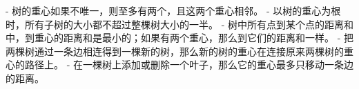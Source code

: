 - 树的重心如果不唯一，则至多有两个，且这两个重心相邻。
- 以树的重心为根时，所有子树的大小都不超过整棵树大小的一半。
- 树中所有点到某个点的距离和中，到重心的距离和是最小的；如果有两个重心，那么到它们的距离和一样。
- 把两棵树通过一条边相连得到一棵新的树，那么新的树的重心在连接原来两棵树的重心的路径上。
- 在一棵树上添加或删除一个叶子，那么它的重心最多只移动一条边的距离。